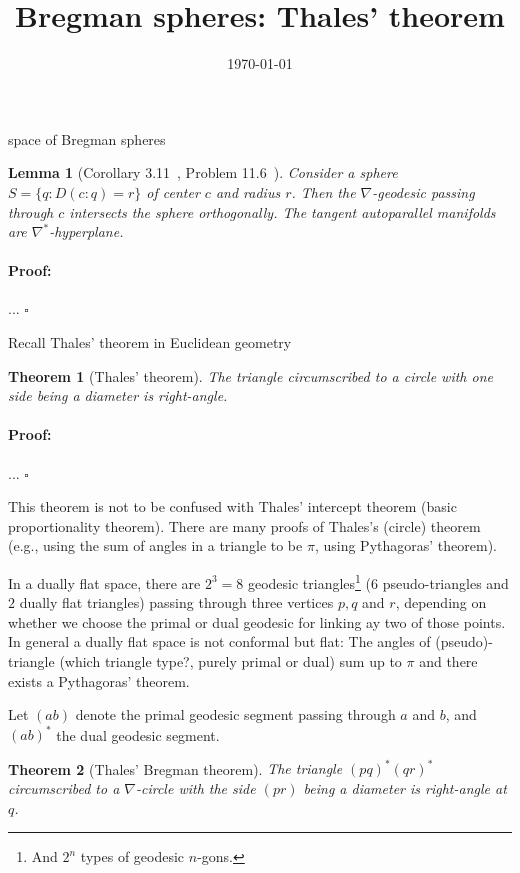 \documentclass{article}
\newtheorem{theorem}{Theorem}
\newenvironment{proof}{\paragraph{Proof:}}{\hfill$\square$}
\newtheorem{lemma}{Lemma}
\begin{document}
\title{Bregman spheres: Thales' theorem}

\date{\today}
\maketitle

\cite{IG-2016}

space of Bregman spheres \cite{BVD-2010}


\begin{lemma}[Corollary 3.11~\cite{Amari-2007}, Problem 11.6~\cite{IG-2014}]
Consider a sphere $S=\{q : D(c:q)=r\}$ of center $c$ and radius $r$.
Then the $\nabla$-geodesic passing through $c$ intersects the sphere orthogonally.
The tangent autoparallel manifolds are $\nabla^*$-hyperplane.
\end{lemma}

\begin{proof}
...
\end{proof}


Recall Thales' theorem in Euclidean geometry
\begin{theorem}[Thales' theorem]
The triangle circumscribed to a circle with one side being a diameter is right-angle.
\end{theorem}

\begin{proof}
...
\end{proof}

This theorem is not to be confused with Thales' intercept theorem (basic proportionality theorem).
There are many proofs of Thales's (circle) theorem (e.g., using the sum of angles in a triangle to be $\pi$, using Pythagoras' theorem).


In a dually flat space, there are $2^3=8$ geodesic triangles\footnote{And $2^n$ types of geodesic $n$-gons.} ($6$ pseudo-triangles and $2$ dually flat triangles) passing through three vertices $p, q$ and $r$, depending on whether we choose the primal or dual geodesic for linking ay two of those points.
In general a dually flat space is not conformal but flat: The angles of (pseudo)-triangle (which triangle type?, purely primal or dual) sum up to $\pi$ and there exists a Pythagoras' theorem.
 
Let $(ab)$ denote the primal geodesic segment passing through $a$ and $b$, and $(ab)^*$ the dual geodesic segment. 

\begin{theorem}[Thales' Bregman theorem]
The triangle $(pq)^*(qr)^*$ circumscribed to a $\nabla$-circle with the  side $(pr)$ being a diameter is right-angle at $q$.
\end{theorem}
\end{document}
